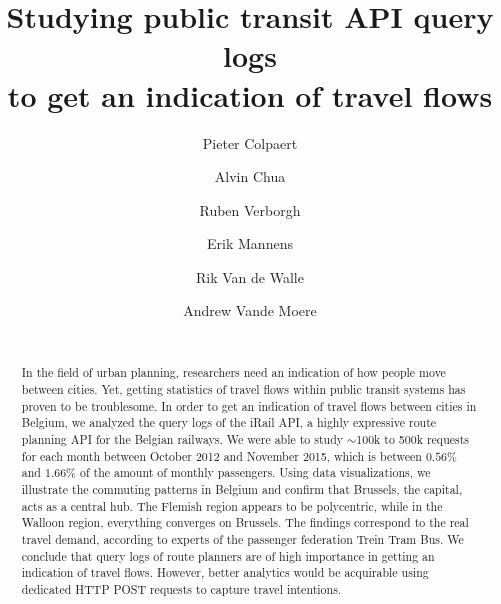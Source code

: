 \documentclass{sig-alternate}
\begin{document}
\title{Studying public transit API query logs\\ to get an indication of travel flows}
\author{
\alignauthor
Pieter Colpaert\\
\and
\alignauthor
Alvin Chua\\
\and
\alignauthor
Ruben Verborgh\\
\and
\alignauthor
Erik Mannens\\
\and
\alignauthor
Rik Van de Walle\\
\and
\alignauthor
Andrew Vande Moere\\
\\
}

\maketitle
\begin{abstract}

In the field of urban planning, researchers need an indication of how people move between cities. 
Yet, getting statistics of travel flows within public transit systems has proven to be troublesome.
In order to get an indication of travel flows between cities in Belgium,
we analyzed the query logs of the iRail API, a highly expressive route planning API for the Belgian railways.
We were able to study $\sim$100k to 500k requests for each month between October 2012 and November 2015, which is between $0.56\%$ and $1.66\%$ of the amount of monthly passengers.
Using data visualizations, we illustrate the commuting patterns in Belgium and confirm that Brussels, the capital, acts as a central hub. 
The Flemish region appears to be polycentric, while in the Walloon region, everything converges on Brussels.
The findings correspond to the real travel demand, according to experts of the passenger federation Trein Tram Bus.
We conclude that query logs of route planners are of high importance in getting an indication of travel flows.
However, better analytics would be acquirable using dedicated HTTP POST requests to capture travel intentions.

\end{abstract}
\end{document}
